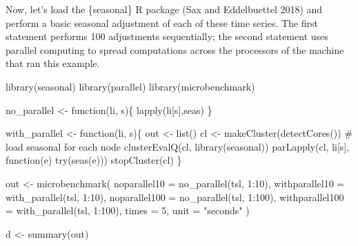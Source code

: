 \documentclass[
  12pt,
  letterpaper,
]{krantz}
\newenvironment{Shaded}{\begin{snugshade}}{\end{snugshade}}
\newcommand{\AttributeTok}[1]{\textcolor[rgb]{0.40,0.45,0.13}{#1}}
\newcommand{\CommentTok}[1]{\textcolor[rgb]{0.37,0.37,0.37}{#1}}
\newcommand{\ControlFlowTok}[1]{\textcolor[rgb]{0.00,0.23,0.31}{#1}}
\newcommand{\DecValTok}[1]{\textcolor[rgb]{0.68,0.00,0.00}{#1}}
\newcommand{\FunctionTok}[1]{\textcolor[rgb]{0.28,0.35,0.67}{#1}}
\newcommand{\NormalTok}[1]{\textcolor[rgb]{0.00,0.23,0.31}{#1}}
\newcommand{\OtherTok}[1]{\textcolor[rgb]{0.00,0.23,0.31}{#1}}
\newcommand{\SpecialCharTok}[1]{\textcolor[rgb]{0.37,0.37,0.37}{#1}}
\newcommand{\StringTok}[1]{\textcolor[rgb]{0.13,0.47,0.30}{#1}}
\begin{document}
Now, let's load the \{seasonal\} R package (Sax and Eddelbuettel 2018)
and perform a basic seasonal adjustment of each of these time
series. The first statement performs 100 adjustments
sequentially; the second statement uses parallel computing to spread
computations across the processors of the machine that ran this example.

\begin{Shaded}
\begin{Highlighting}[]
\FunctionTok{library}\NormalTok{(seasonal)}
\FunctionTok{library}\NormalTok{(parallel)}
\FunctionTok{library}\NormalTok{(microbenchmark)}


\NormalTok{no\_parallel }\OtherTok{\textless{}{-}} \ControlFlowTok{function}\NormalTok{(li, s)\{}
  \FunctionTok{lapply}\NormalTok{(li[s],seas)}
\NormalTok{\}}

\NormalTok{with\_parallel }\OtherTok{\textless{}{-}} \ControlFlowTok{function}\NormalTok{(li, s)\{}
\NormalTok{  out }\OtherTok{\textless{}{-}} \FunctionTok{list}\NormalTok{()}
\NormalTok{  cl }\OtherTok{\textless{}{-}} \FunctionTok{makeCluster}\NormalTok{(}\FunctionTok{detectCores}\NormalTok{())}
  \CommentTok{\# load \textquotesingle{}seasonal\textquotesingle{} for each node}
  \FunctionTok{clusterEvalQ}\NormalTok{(cl, }\FunctionTok{library}\NormalTok{(seasonal))}
  \FunctionTok{parLapply}\NormalTok{(cl, li[s], }\ControlFlowTok{function}\NormalTok{(e) }\FunctionTok{try}\NormalTok{(}\FunctionTok{seas}\NormalTok{(e)))}
  \FunctionTok{stopCluster}\NormalTok{(cl)}
\NormalTok{\}}


\NormalTok{out }\OtherTok{\textless{}{-}} \FunctionTok{microbenchmark}\NormalTok{(}
    \AttributeTok{noparallel10 =} \FunctionTok{no\_parallel}\NormalTok{(tsl, }\DecValTok{1}\SpecialCharTok{:}\DecValTok{10}\NormalTok{),}
    \AttributeTok{withparallel10 =} \FunctionTok{with\_parallel}\NormalTok{(tsl, }\DecValTok{1}\SpecialCharTok{:}\DecValTok{10}\NormalTok{),}
    \AttributeTok{noparallel100 =} \FunctionTok{no\_parallel}\NormalTok{(tsl, }\DecValTok{1}\SpecialCharTok{:}\DecValTok{100}\NormalTok{),}
    \AttributeTok{withparallel100 =} \FunctionTok{with\_parallel}\NormalTok{(tsl, }\DecValTok{1}\SpecialCharTok{:}\DecValTok{100}\NormalTok{),}
    \AttributeTok{times =} \DecValTok{5}\NormalTok{,}
    \AttributeTok{unit =} \StringTok{"seconds"}
\NormalTok{)}

\NormalTok{d }\OtherTok{\textless{}{-}} \FunctionTok{summary}\NormalTok{(out)}
\end{Highlighting}
\end{Shaded}
\end{document}
